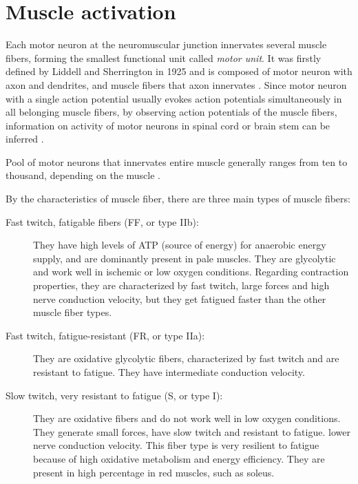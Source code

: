 \section{Muscle activation}

Each motor neuron at the neuromuscular junction innervates several muscle fibers, forming the smallest functional unit called \emph{motor unit}. It was firstly defined by Liddell and Sherrington in 1925 \citep{Liddell1925, Sherrington1925} and is composed of motor neuron with axon and dendrites, and muscle fibers that axon innervates \citep{Duchateau2011}. Since motor neuron with a single action potential usually evokes action potentials simultaneously in all belonging muscle fibers, by observing action potentials of the muscle fibers, information on activity of motor neurons in spinal cord or brain stem can be inferred \citep{Merletti-Farina-book}. %

Pool of motor neurons that innervates entire muscle generally ranges from ten to thousand, depending on the muscle \citep{Merletti-Farina-book}.

By the characteristics of muscle fiber, there are three main types of muscle fibers:
\begin{description}
\item[Fast twitch, fatigable fibers (FF, or type IIb):] They have high levels of ATP (source of energy) for anaerobic energy supply, and are dominantly present in pale muscles. They are glycolytic and work well in ischemic or low oxygen conditions. Regarding contraction properties, they are characterized by fast twitch, large forces and high nerve conduction velocity, but they get fatigued faster than the other muscle fiber types. 

\item[Fast twitch, fatigue-resistant (FR, or type IIa):] They are oxidative glycolytic fibers, characterized by fast twitch and are resistant to fatigue. They have intermediate conduction velocity. 

\item[Slow twitch, very resistant to fatigue (S, or type I):] They are oxidative fibers and do not work well in low oxygen conditions. They generate small forces, have slow twitch and resistant to fatigue. lower nerve conduction velocity. This fiber type is very resilient to fatigue because of high oxidative metabolism and energy efficiency. They are present in high percentage in red muscles, such as soleus.
\end{description}

